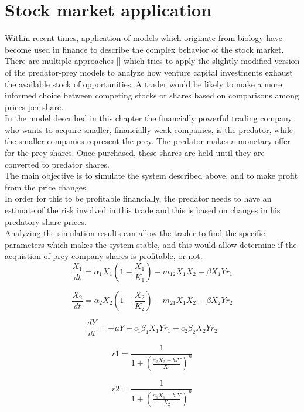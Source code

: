 \documentclass[]{article}
\begin{document}
\section{Stock market application}\label{stock-market-application}

Within recent times, application of models which originate from biology
have become used in finance to describe the complex behavior of the
stock market. There are multiple approaches {[}{]} which tries to apply
the slightly modified version of the predator-prey models to analyze how
venture capital investments exhaust the available stock of
opportunities. A trader would be likely to make a more informed choice
between competing stocks or shares based on comparisons among prices per
share.\\
In the model described in this chapter the financially powerful trading
company who wants to acquire smaller, financially weak companies, is the
predator, while the smaller companies represent the prey. The predator
makes a monetary offer for the prey shares. Once purchased, these shares
are held until they are converted to predator shares.\\
The main objective is to simulate the system described above, and to
make profit from the price changes.\\
In order for this to be profitable financially, the predator needs to
have an estimate of the risk involved in this trade and this is based on
changes in his predatory share prices.\\
Analyzing the simulation results can allow the trader to find the
specific parameters which makes the system stable, and this would allow
determine if the acquistion of prey company shares is profitable, or
not.\\
\[
\frac{X_{1}}{dt} = \alpha_{1}X_{1}\left ( 1-\frac{X_{1}}{K_{1}} \right )-m_{12}X_{1}X_{2} - \beta X_{1}Yr_{1}
\]

\[
\frac{X_{2}}{dt} = \alpha_{2}X_{2}\left ( 1-\frac{X_{2}}{K_{2}} \right )-m_{21}X_{1}X_{2} - \beta X_{2}Yr_{2}
\]

\[
\frac{dY}{dt} = -\mu Y + c_{1}\beta_{1}X_{1}Yr_{1} + c_{2}\beta_{2}X_{2}Yr_{2}
\]

\[
r1 = \frac{1}{1+\left ( \frac{a_{2}X_{2}+b_{2}Y}{X_{1}} \right )^{n}}
\]

\[
r2 = \frac{1}{1+\left ( \frac{a_{1}X_{1}+b_{1}Y}{X_{2}} \right )^{n}}
\]
\end{document}

